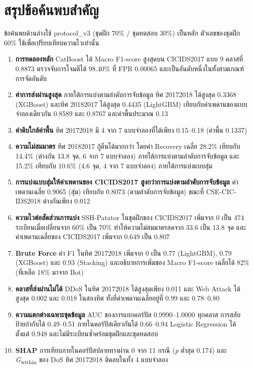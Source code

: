 \section{สรุปข้อค้นพบสำคัญ}
\label{sec:key-findings}

ข้อค้นพบด้านล่างใช้ protocol\_v3 (ชุดฝึก 70\% / ชุดทดสอบ 30\%) เป็นหลัก ตัวเลขของชุดฝึก 60\% ใช้เพื่อเปรียบเทียบความไวเท่านั้น

\begin{enumerate}
    \item \textbf{การทดลองหลัก} CatBoost ได้ Macro F1-score สูงสุดบน CICIDS2017 แบบ 9 คลาสที่ 0.8873 ตรวจจับการโจมตีได้ 98.40\% ที่ FPR 0.00065 และเป็นอันดับหนึ่งในทั้งสามเกณฑ์การจัดอันดับ
    \item \textbf{ค่าการส่งผ่านสูงสุด} ภายใต้การแบ่งตามลำดับการจับข้อมูล ทิศ 2017\dirarrow{}2018 ได้สูงสุด 0.3368 (XGBoost) และทิศ 2018\dirarrow{}2017 ได้สูงสุด 0.4435 (LightGBM) เทียบกับค่าเพดานของแบบจำลองเดียวกัน 0.8589 และ 0.8767 และค่าพื้นประมาณ 0.13
    \item \textbf{ค่าดิบใกล้ค่าพื้น} ทิศ 2017\dirarrow{}2018 มี 4 จาก 7 แบบจำลองที่ได้เพียง 0.15--0.18 (ค่าพื้น 0.1337)
    \item \textbf{ความไม่สมมาตร} ทิศ 2018\dirarrow{}2017 กู้คืนได้มากกว่า โดยค่า Recovery เฉลี่ย 28.2\% เทียบกับ 14.4\% (ต่างกัน 13.8 จุด, 6 จาก 7 แบบจำลอง) ภายใต้การแบ่งตามลำดับการจับข้อมูล และ 15.2\% เทียบกับ 10.6\% (4.6 จุด, 4 จาก 7 แบบจำลอง) ภายใต้การแบ่งแบบสุ่ม
    \item \textbf{การแบ่งแบบสุ่มให้ค่าเพดานของ CICIDS2017 สูงกว่าการแบ่งตามลำดับการจับข้อมูล} ค่าเพดานเฉลี่ย 0.9065 (สุ่ม) เทียบกับ 0.8073 (ตามลำดับการจับข้อมูล) ขณะที่ CSE-CIC-IDS2018 ต่างกันเพียง 0.012
    \item \textbf{ความไวต่อสัดส่วนการแบ่ง} SSH-Patator ในชุดฝึกของ CICIDS2017 เพิ่มจาก 0 เป็น 474 ระเบียนเมื่อเปลี่ยนจาก 60\% เป็น 70\% ทำให้ความไม่สมมาตรลดจาก 33.6 เป็น 13.8 จุด และค่าเพดานเฉลี่ยของ CICIDS2017 เพิ่มจาก 0.649 เป็น 0.807
    \item \textbf{Brute Force} ค่า F1 ในทิศ 2017\dirarrow{}2018 เพิ่มจาก 0 เป็น 0.77 (LightGBM), 0.79 (XGBoost) และ 0.93 (Stacking) และอธิบายการเพิ่มของ Macro F1-score เฉลี่ยได้ 82\% (ที่เหลือ 18\% มาจาก Bot)
    \item \textbf{คลาสที่ส่งผ่านไม่ได้} DDoS ในทิศ 2017\dirarrow{}2018 ได้สูงสุดเพียง 0.011 และ Web Attack ได้สูงสุด 0.002 และ 0.018 ในสองทิศ ทั้งที่ค่าเพดานเฉลี่ยอยู่ที่ 0.99 และ 0.78--0.80
    \item \textbf{ความแตกต่างเฉพาะชุดข้อมูล} AUC ของการแยกคอร์ปัส 0.9990--1.0000 ทุกคลาส การสลับป้ายกำกับได้ 0.49--0.51 ภายในคอร์ปัสเดียวกันได้ 0.66--0.94 Logistic Regression ได้ตั้งแต่ 0.948 และไม่มีระเบียนซ้ำคร่อมชุดฝึกและชุดทดสอบ
    \item \textbf{SHAP} การเทียบภายในคอร์ปัสปลายทางผ่าน 0 จาก 11 กรณี (\textit{p} ต่ำสุด 0.174) และ \textit{G}\textsubscript{within} ของ DoS ทิศ 2017\dirarrow{}2018 ติดลบในทั้ง 4 แบบจำลอง
\end{enumerate}
